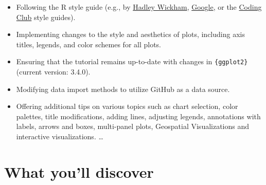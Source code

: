 \documentclass[
  letterpaper,
  DIV=11,
  numbers=noendperiod]{scrreprt}
\providecommand{\tightlist}{%
  \setlength{\itemsep}{0pt}\setlength{\parskip}{0pt}}\usepackage{longtable,booktabs,array}
\begin{document}
\begin{itemize}
\tightlist
\item
  Following the R style guide (e.g., by
  \href{https://style.tidyverse.org}{Hadley Wickham},
  \href{https://google.github.io/styleguide/Rguide.xml}{Google}, or the
  \href{https://ourcodingclub.github.io/2017/04/25/etiquette.html\#syntax}{Coding
  Club} style guides).
\item
  Implementing changes to the style and aesthetics of plots, including
  axis titles, legends, and color schemes for all plots.
\item
  Ensuring that the tutorial remains up-to-date with changes in
  \texttt{\{ggplot2\}} (current version: 3.4.0).
\item
  Modifying data import methods to utilize GitHub as a data source.
\item
  Offering additional tips on various topics such as chart selection,
  color palettes, title modifications, adding lines, adjusting legends,
  annotations with labels, arrows and boxes, multi-panel plots,
  Geospatial Visualizations and interactive visualizations. \ldots{}
\end{itemize}

\section*{What you'll discover}\label{toc}

\end{document}
